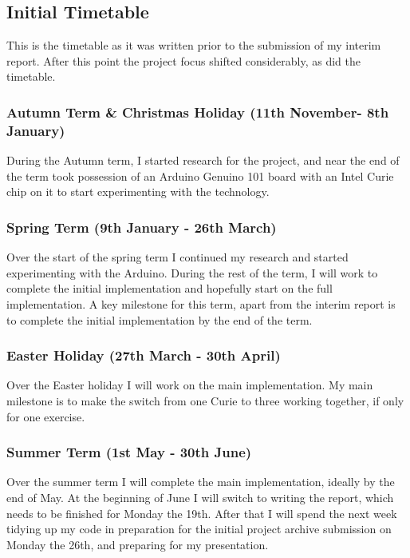 \documentclass[a4paper]{article}
\begin{document}
\subsection{Initial Timetable}%
\label{subsec:a3_it}

This is the timetable as it was written prior to the submission of my interim report. After this point the project focus shifted considerably, as did the timetable.

\subsubsection{Autumn Term \& Christmas Holiday (11th November- 8th January)}

During the Autumn term, I started research for the project, and near the end of the term took possession of an Arduino Genuino 101 board with an Intel Curie chip on it to start experimenting with the technology.

\subsubsection{Spring Term (9th January - 26th March)}

Over the start of the spring term I continued my research and started experimenting with the Arduino. During the rest of the term, I will work to complete the initial implementation and hopefully start on the full implementation. A key milestone for this term, apart from the interim report is to complete the initial implementation by the end of the term.

\subsubsection{Easter Holiday (27th March - 30th April)}

Over the Easter holiday I will work on the main implementation. My main milestone is to make the switch from one Curie to three working together, if only for one exercise. 

\subsubsection{Summer Term (1st May - 30th June)}

Over the summer term I will complete the main implementation, ideally by the end of May. At the beginning of June I will switch to writing the report, which needs to be finished for Monday the 19th. After that I will spend the next week tidying up my code in preparation for the initial project archive submission on Monday the 26th, and preparing for my presentation. 
\end{document}
